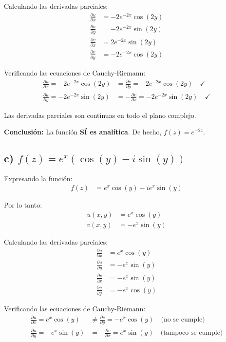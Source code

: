 \documentclass{article}
\begin{document}
Calculando las derivadas parciales:
\begin{align*}
\frac{\partial u}{\partial x} &= -2e^{-2x}\cos(2y) \\
\frac{\partial u}{\partial y} &= -2e^{-2x}\sin(2y) \\
\frac{\partial v}{\partial x} &= 2e^{-2x}\sin(2y) \\
\frac{\partial v}{\partial y} &= -2e^{-2x}\cos(2y)
\end{align*}

Verificando las ecuaciones de Cauchy-Riemann:
\begin{align*}
\frac{\partial u}{\partial x} = -2e^{-2x}\cos(2y) &= \frac{\partial v}{\partial y} = -2e^{-2x}\cos(2y) \quad \checkmark \\
\frac{\partial u}{\partial y} = -2e^{-2x}\sin(2y) &= -\frac{\partial v}{\partial x} = -2e^{-2x}\sin(2y) \quad \checkmark
\end{align*}

Las derivadas parciales son continuas en todo el plano complejo.

\textbf{Conclusión:} La función \textbf{SÍ es analítica}. De hecho, $f(z) = e^{-2z}$.

\subsection*{c) $f(z) = e^x(\cos(y) - i\sin(y))$}

Expresando la función:
\begin{align*}
f(z) &= e^x\cos(y) - ie^x\sin(y)
\end{align*}

Por lo tanto:
\begin{align*}
u(x,y) &= e^x\cos(y) \\
v(x,y) &= -e^x\sin(y)
\end{align*}

Calculando las derivadas parciales:
\begin{align*}
\frac{\partial u}{\partial x} &= e^x\cos(y) \\
\frac{\partial u}{\partial y} &= -e^x\sin(y) \\
\frac{\partial v}{\partial x} &= -e^x\sin(y) \\
\frac{\partial v}{\partial y} &= -e^x\cos(y)
\end{align*}

Verificando las ecuaciones de Cauchy-Riemann:
\begin{align*}
\frac{\partial u}{\partial x} = e^x\cos(y) &\neq \frac{\partial v}{\partial y} = -e^x\cos(y) \quad \text{(no se cumple)} \\
\frac{\partial u}{\partial y} = -e^x\sin(y) &= -\frac{\partial v}{\partial x} = e^x\sin(y) \quad \text{(tampoco se cumple)}
\end{align*}
\end{document}
